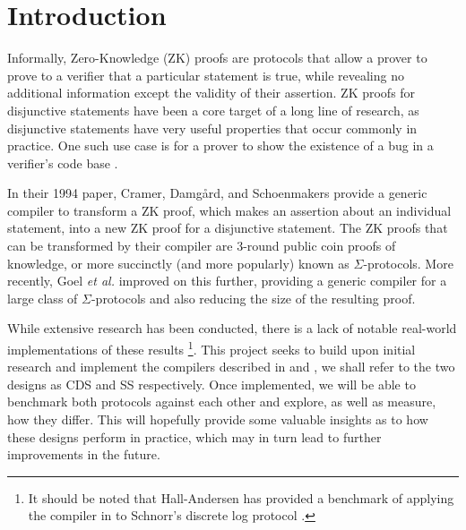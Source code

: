 \section{Introduction}
Informally, Zero-Knowledge (ZK) proofs are protocols that allow a prover to prove to a verifier that a particular statement is true, while revealing no additional information except the validity of their assertion. ZK proofs for disjunctive statements have been a core target of a long line of research, as disjunctive statements have very useful properties that occur commonly in practice. One such use case is for a prover to show the existence of a bug in a verifier's code base \cite{StackedGF}.

In their 1994 paper, Cramer, Damg{\aa}rd, and Schoenmakers \cite{CDS94} provide a generic compiler to transform a ZK proof, which makes an assertion about an individual statement, into a new ZK proof for a disjunctive statement. The ZK proofs that can be transformed by their compiler are 3-round public coin proofs of knowledge, or more succinctly (and more popularly) known as $\Sigma$-protocols. %
More recently, Goel {\em et al.} \cite{StackingSigmas} improved on this further, providing a generic compiler for a large class of $\Sigma$-protocols and also reducing the size of the resulting proof. 

While extensive research has been conducted, there is a lack of notable real-world implementations of these results
\footnote{It should be noted that Hall-Andersen \cite{MHAStackSig} has provided a benchmark of applying the compiler in \cite{StackingSigmas} to Schnorr's discrete log protocol \cite{Schnorr}.}. 
This project seeks to build upon initial research and implement the compilers described in \cite{CDS94} and \cite{StackingSigmas}, we shall refer to the two designs as CDS and SS respectively. Once implemented, we will be able to benchmark both protocols against each other and explore, as well as measure, how they differ. This will hopefully provide some valuable insights as to how these designs perform in practice, which may in turn lead to further improvements in the future. 


